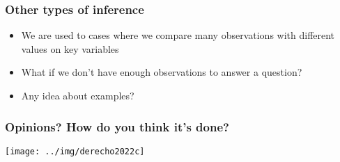 \documentclass[aspectratio=43]{beamer}
\begin{document}





\begin{frame}
\frametitle{Other types of inference}
\centering

\begin{itemize}
  \item We are used to cases where we compare many observations with different values on key variables
  \item What if we don't have enough observations to answer a question?
  \item Any idea about examples?
\end{itemize}

\end{frame}
    


\begin{frame}
\frametitle{Opinions? How do you think it's done?}
\centering

\texttt{[image: ../img/derecho2022c]}

\end{frame}

\end{document}
